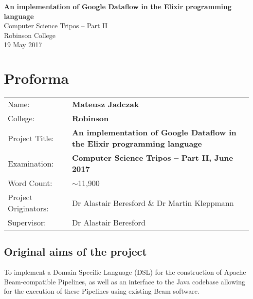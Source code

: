 
\begin{titlepage}

\vspace*{60mm}
\begin{center}
\Huge
\textbf{An implementation of Google Dataflow in the Elixir programming language} \\[5mm]
Computer Science Tripos -- Part II \\[5mm]
Robinson College \\[5mm]
19 May 2017 \\[20mm]
\end{center}
\end{titlepage}



{\let\cleardoublepage\clearpage \chapter*{Proforma} %

{\large\tabulinesep=1mm
\begin{tabu}{lX[p]}
Name:               & \textbf {Mateusz Jadczak}                       \\
College:            & \textbf {Robinson}                     \\
Project Title:      & {\textbf{An implementation of Google Dataflow in the Elixir programming language}} \\
Examination:        & \textbf {Computer Science Tripos -- Part II, June 2017}  \\
Word Count:         & $\sim$11,900\footnotemark[1]  \\
Project Originators: & Dr Alastair Beresford \& Dr Martin Kleppmann     \\
Supervisor:         &   Dr Alastair Beresford           \\ 
\end{tabu}
}

\bigskip

\section*{Original aims of the project}

To implement a Domain Specific Language (DSL) for the construction of Apache Beam-compatible Pipelines, as well as an interface to the Java codebase allowing for the execution of these Pipelines using existing Beam software.

}
